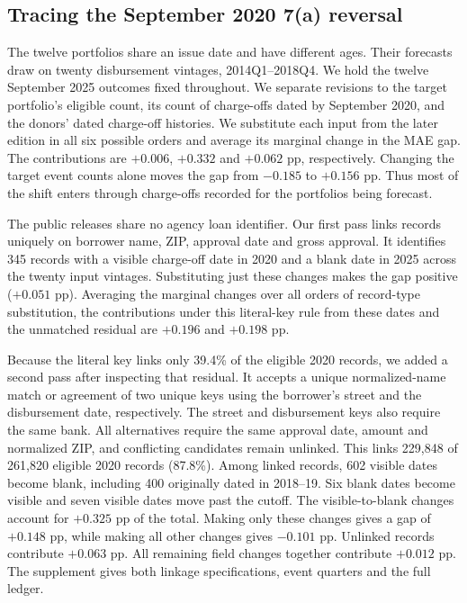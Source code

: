 \subsection{Tracing the September 2020 7(a) reversal}
The twelve portfolios share an issue date and have different ages. Their forecasts draw on twenty disbursement vintages, 2014Q1--2018Q4. We hold the twelve September 2025 outcomes fixed throughout. We separate revisions to the target portfolio's eligible count, its count of charge-offs dated by September 2020, and the donors' dated charge-off histories. We substitute each input from the later edition in all six possible orders and average its marginal change in the MAE gap. The contributions are $+0.006$, $+0.332$ and $+0.062$ pp, respectively. Changing the target event counts alone moves the gap from $-0.185$ to $+0.156$ pp. Thus most of the shift enters through charge-offs recorded for the portfolios being forecast.

The public releases share no agency loan identifier. Our first pass links records uniquely on borrower name, ZIP, approval date and gross approval. It identifies 345 records with a visible charge-off date in 2020 and a blank date in 2025 across the twenty input vintages. Substituting just these changes makes the gap positive ($+0.051$ pp). Averaging the marginal changes over all orders of record-type substitution, the contributions under this literal-key rule from these dates and the unmatched residual are $+0.196$ and $+0.198$ pp.

Because the literal key links only 39.4\% of the eligible 2020 records, we added a second pass after inspecting that residual. It accepts a unique normalized-name match or agreement of two unique keys using the borrower's street and the disbursement date, respectively. The street and disbursement keys also require the same bank. All alternatives require the same approval date, amount and normalized ZIP, and conflicting candidates remain unlinked. This links 229,848 of 261,820 eligible 2020 records (87.8\%). Among linked records, 602 visible dates become blank, including 400 originally dated in 2018--19. Six blank dates become visible and seven visible dates move past the cutoff. The visible-to-blank changes account for $+0.325$ pp of the total. Making only these changes gives a gap of $+0.148$ pp, while making all other changes gives $-0.101$ pp. Unlinked records contribute $+0.063$ pp. All remaining field changes together contribute $+0.012$ pp. The supplement gives both linkage specifications, event quarters and the full ledger.


